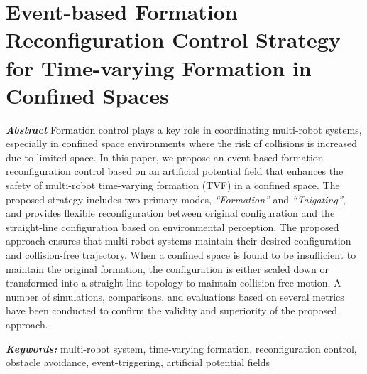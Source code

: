 \chapter{Event-based Formation Reconfiguration Control Strategy for Time-varying Formation in Confined Spaces}\label{paper2}

\vspace{1cm}

\noindent\textit{\textbf{Abstract}}
Formation control plays a key role in coordinating multi-robot systems, especially in confined space environments where the risk of collisions is increased due to limited space. In this paper, we propose an event-based formation reconfiguration control based on an artificial potential field that enhances the safety of multi-robot time-varying formation (TVF) in a confined space. The proposed strategy includes two primary modes, \textit{``Formation''} and \textit{``Taigating''}, and provides flexible reconfiguration between original configuration and the straight-line configuration based on environmental perception. The proposed approach ensures that multi-robot systems maintain their desired configuration and collision-free trajectory. When a confined space is found to be insufficient to maintain the original formation, the configuration is either scaled down or transformed into a straight-line topology to maintain collision-free motion. A number of simulations, comparisons, and evaluations based on several metrics have been conducted to confirm the validity and superiority of the proposed approach.

\noindent\textbf{\textit{Keywords:}}
multi-robot system, time-varying formation, reconfiguration control, obstacle avoidance, event-triggering, artificial potential fields







